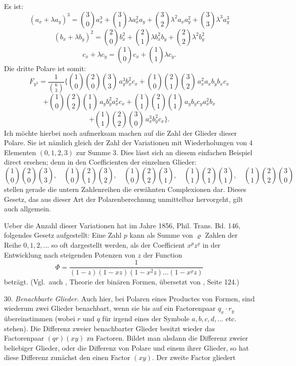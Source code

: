 Es ist:
\[
(a_x + \lambda a_y)^3 = \binom{3}{0} a_x^3 + \binom{3}{1} \lambda a_x^2 a_y + \binom{3}{2} \lambda^2 a_x a_y^2 + \binom{3}{3} \lambda^3 a_y^3
\]
\[
(b_x + \lambda b_y)^2 = \binom{2}{0} b_x^2 + \binom{2}{1} \lambda b_x^2 b_y + \binom{2}{2} \lambda^2 b_y^2
\]
\[
c_x + \lambda c_y = \binom{1}{0} c_x + \binom{1}{1} \lambda c_y .
\]
Die dritte Polare ist somit:
\[
F_{y^3} = \frac{1}{\binom{6}{3}} \Big\{ \binom{1}{0}\binom{2}{0}\binom{3}{3}\, a_y^3 b_x^2 c_x + \binom{1}{0}\binom{2}{1}\binom{3}{2}\, a_x^2 a_x b_y b_x c_x %
\]
\[
+ \binom{1}{0}\binom{2}{2}\binom{1}{1}\, a_y b_y^2 a_x^2 c_x + \binom{1}{1}\binom{2}{1}\binom{1}{1}\, a_y b_y c_y a_x^2 b_x %
\]
\[
+ \binom{1}{1}\binom{2}{2}\binom{3}{0}\, a_x^3 b_y^2 c_x \Big\} . %
\]
Ich möchte hierbei noch aufmerksam machen auf die Zahl der Glieder dieser Polare. Sie ist nämlich gleich der Zahl der Variationen mit Wiederholungen von 4 Elementen $(0, 1, 2, 3)$ zur Summe 3. Dies lässt sich an diesem einfachen Beispiel direct ersehen; denn in den Coefficienten der einzelnen Glieder:
\[
\binom{1}{0}\binom{2}{0}\binom{3}{3}, \quad \binom{1}{0}\binom{2}{1}\binom{3}{2}, \quad \binom{1}{0}\binom{2}{2}\binom{3}{1}, \quad \binom{1}{1}\binom{2}{1}\binom{3}{1}, \quad \binom{1}{1}\binom{2}{2}\binom{3}{0}
\]
stellen gerade die untern Zahlenreihen die erwähnten Complexionen dar. Dieses Gesetz, das aus dieser Art der Polarenberechnung unmittelbar hervorgeht, gilt auch allgemein.

Ueber die Anzahl dieser Variationen hat  im Jahre 1856, Phil. Trans. Bd. 146, folgendes Gesetz aufgestellt:
\glqq Eine Zahl $p$ kann als Summe von $\varrho$ Zahlen der Reihe
$0, 1, 2, \ldots$ so oft dargestellt werden, als der Coefficient $x^p z^{\varrho}$
in der Entwicklung nach steigenden Potenzen von $z$ der
Function
\[
\Phi = \frac{1}{(1-z)(1-xz)(1-x^2 z) \ldots (1-x^{\varrho} z)}
\]
beträgt. (Vgl.\ auch , Theorie der binären Formen, übersetzt von , Seite 124.)

30. \textit{Benachbarte Glieder.} Auch hier, bei Polaren eines Productes von Formen, sind wiederum zwei Glieder benachbart, wenn sie bis auf ein Factorenpaar $q_x \cdot r_y$ übereinstimmen (wobei $r$ und $q$ für irgend eines der Symbole $a, b, c, d, \ldots$ etc. stehen). Die Differenz zweier benachbarter Glieder besitzt wieder das Factorenpaar $(qr)(xy)$ zu Factoren. Bildet man alsdann die Differenz zweier beliebiger Glieder, oder die Differenz von Polare und einem ihrer Glieder, so hat diese Differenz zunächst den einen Factor $(xy)$. Der zweite Factor gliedert


